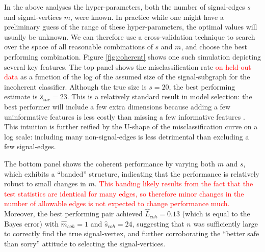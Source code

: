 \documentclass[10pt,journal,cspaper,compsoc]{IEEEtran}
\providecommand{\tr}[1]{\textcolor{red}{#1}}
\providecommand{\wh}[1]{\widehat{#1}}
\begin{document}
In the above analyses the hyper-parameters, both the number of signal-edges $s$ and signal-vertices $m$, were known.  In practice while one might have a preliminary guess of the range of these hyper-parameters, the optimal values will usually be unknown.  We can therefore use a cross-validation technique to search over the space of all reasonable combinations of $s$ and $m$, and choose the best performing combination.  Figure \ref{fig:coherent} shows one such simulation depicting several key features.  The top panel shows the misclassification rate \tr{on held-out data} as a function of the log of the assumed size of the signal-subgraph for the incoherent classifier.  Although the true size is $s=20$, the best performing estimate is $\wh{s}_{inc}=23$. This is a relatively standard result in model selection: the best performer will include a few extra dimensions because adding a few uninformative features is less costly than missing a few informative features \cite{Jain2000}.  This intuition is further reified by the U-shape of the misclassification curve on a log scale: including many non-signal-edges is less detrimental than excluding a few signal-edges.

The bottom panel shows the coherent performance by varying both $m$ and $s$, which exhibits a ``banded''  structure, indicating that the performance is relatively robust to small changes in $m$.  \tr{This banding likely results from the fact that the test statistics are identical for many edges, so therefore minor changes in the number of allowable edges is not expected to change performance much.}
Moreover, the best performing pair achieved $\wh{L}_{coh}=0.13$ (which is equal to the Bayes error) with $\wh{m}_{coh}=1$ and $\wh{s}_{coh}=24$, suggesting that $n$ was sufficiently large to correctly find the true signal-vertex, and further corroborating the ``better safe than sorry'' attitude to selecting the signal-vertices. 
\end{document}
